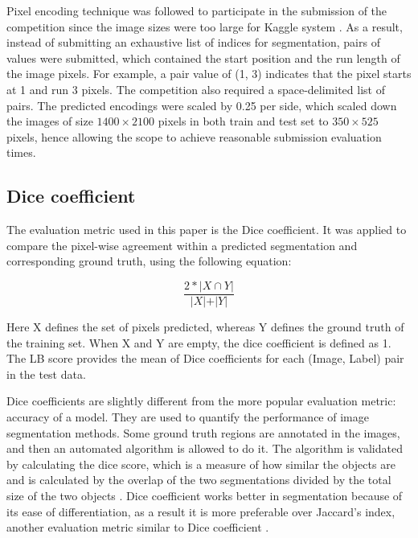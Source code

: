 \documentclass[conference]{IEEEtran}
\begin{document}
Pixel encoding technique was followed to participate in the submission of the competition since the image sizes were too large for Kaggle system  \cite{richards1993method}. As a result, instead of submitting an exhaustive list of indices for segmentation, pairs of values were submitted, which contained the start position and the run length of the image pixels. For example, a pair value of (1, 3) indicates that the pixel starts at 1 and run 3 pixels. The competition also required a space-delimited list of pairs. The predicted encodings were scaled by 0.25 per side, which scaled down the images of size $1400\times2100$ pixels in both train and test set to $350\times525$ pixels, hence allowing the scope to achieve reasonable submission evaluation times.





\subsection{Dice coefficient}\label{dsc}

The evaluation metric used in this paper is the Dice coefficient. It was applied to compare the pixel-wise agreement within a predicted segmentation and corresponding ground truth, using the following equation:


\begin{center}
\begin{equation}
   \frac{2*\lvert X\cap Y\rvert}{\rvert X\rvert+\rvert Y\rvert}
\end{equation}
\end{center}

Here X defines the set of pixels predicted, whereas Y defines the ground truth of the training set. When X and Y are empty, the dice coefficient is defined as 1. The LB score provides the mean of Dice coefficients for each (Image, Label) pair in the test data.

Dice coefficients are slightly different from the more popular evaluation metric: accuracy of a model. They are used to quantify the performance of image segmentation methods. Some ground truth regions are annotated in the images, and then an automated algorithm is allowed to do it. The algorithm is validated by calculating the dice score, which is a measure of how similar the objects are and is calculated by the overlap of the two segmentations divided by the total size of the two objects \cite{dice1945measures}.  Dice coefficient works better in segmentation because of its ease of differentiation, as a result it is more preferable over Jaccard's index, another evaluation metric similar to Dice coefficient \cite{niwattanakul2013using}.
\end{document}
